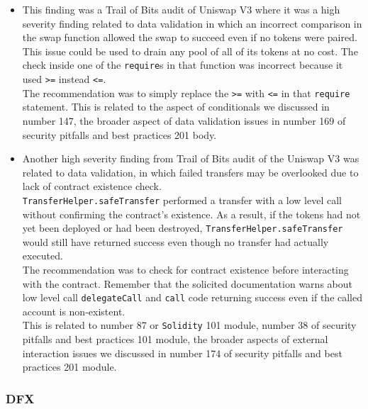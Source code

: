 \begin{itemize}
\item
  This finding was a Trail of Bits audit of Uniswap V3 where it was a
  high severity finding related to data validation in which an incorrect
  comparison in the swap function allowed the swap to succeed even if no
  tokens were paired.\\

  This issue could be used to drain any pool of all of its tokens at no
  cost. The check inside one of the \texttt{require}s in that function
  was incorrect because it used \texttt{\textgreater{}=} instead
  \texttt{\textless{}=}.\\

  The recommendation was to simply replace the \texttt{\textgreater{}=}
  with \texttt{\textless{}=} in that \texttt{require} statement. This is
  related to the aspect of conditionals we discussed in number 147, the
  broader aspect of data validation issues in number 169 of security
  pitfalls and best practices 201 body.
\item
  Another high severity finding from Trail of Bits audit of the Uniswap
  V3 was related to data validation, in which failed transfers may be
  overlooked due to lack of contract existence check.\\

  \texttt{TransferHelper.safeTransfer} performed a transfer with a low
  level call without confirming the contract's existence. As a result,
  if the tokens had not yet been deployed or had been destroyed,
  \texttt{TransferHelper.safeTransfer} would still have returned success
  even though no transfer had actually executed.\\

  The recommendation was to check for contract existence before
  interacting with the contract. Remember that the solicited
  documentation warns about low level call \texttt{delegateCall} and
  \texttt{call} code returning success even if the called account is
  non-existent.\\

  This is related to number 87 or \texttt{Solidity} 101 module, number
  38 of security pitfalls and best practices 101 module, the broader
  aspects of external interaction issues we discussed in number 174 of
  security pitfalls and best practices 201 module.
\end{itemize}

\subsubsection{DFX}\label{dfx}

